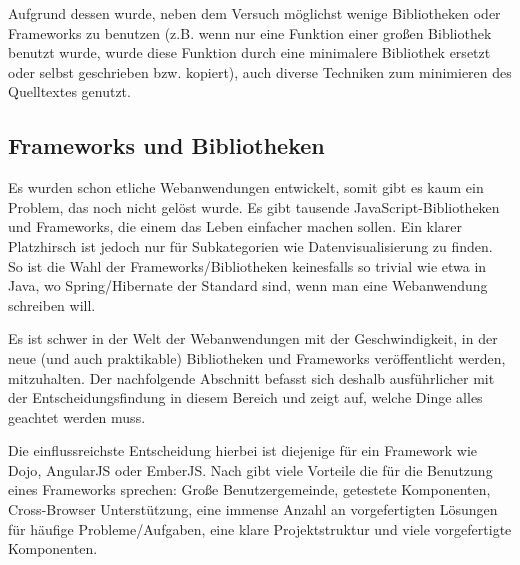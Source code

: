 \documentclass[12pt,twoside]{book}
\begin{document}
Aufgrund dessen wurde, neben dem Versuch möglichst wenige Bibliotheken oder Frameworks zu benutzen (z.B. wenn nur eine Funktion einer großen Bibliothek benutzt wurde, wurde diese Funktion durch eine minimalere Bibliothek ersetzt oder selbst geschrieben bzw. kopiert), auch diverse Techniken zum minimieren des Quelltextes genutzt.

\subsection{Frameworks und Bibliotheken}

Es wurden schon etliche Webanwendungen entwickelt, somit gibt es kaum ein Problem, das noch nicht gelöst wurde. Es gibt tausende JavaScript-Bibliotheken und Frameworks, die einem das Leben einfacher machen sollen. Ein klarer Platzhirsch ist jedoch nur für Subkategorien wie Datenvisualisierung zu finden. So ist die Wahl der Frameworks/Bibliotheken keinesfalls so trivial wie etwa in Java, wo Spring/Hibernate der Standard sind, wenn man eine Webanwendung schreiben will.

Es ist schwer in der Welt der Webanwendungen mit der Geschwindigkeit, in der neue (und auch praktikable) Bibliotheken und Frameworks veröffentlicht werden, mitzuhalten. Der nachfolgende Abschnitt befasst sich deshalb ausführlicher mit der Entscheidungsfindung in diesem Bereich und zeigt auf, welche Dinge alles geachtet werden muss.

Die einflussreichste Entscheidung hierbei ist diejenige für ein Framework wie Dojo\cite{dojo}, AngularJS\cite{angularjs} oder EmberJS\cite{emberjs}.
Nach \cite{prosandcons} gibt viele Vorteile die für die Benutzung eines Frameworks sprechen: Große Benutzergemeinde, getestete Komponenten, Cross-Browser Unterstützung, eine immense Anzahl an vorgefertigten Lösungen für häufige Probleme/Aufgaben, eine klare Projektstruktur und viele vorgefertigte Komponenten.
\end{document}
